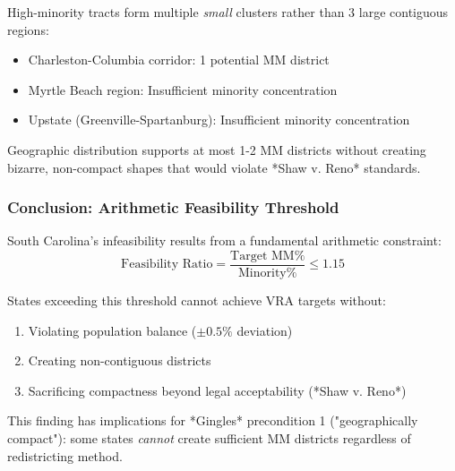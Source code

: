 High-minority tracts form multiple \textit{small} clusters rather than 3 large contiguous regions:
\begin{itemize}
    \item Charleston-Columbia corridor: 1 potential MM district
    \item Myrtle Beach region: Insufficient minority concentration
    \item Upstate (Greenville-Spartanburg): Insufficient minority concentration
\end{itemize}

Geographic distribution supports at most 1-2 MM districts without creating bizarre, non-compact shapes that would violate *Shaw v. Reno* standards.

\subsubsection{Conclusion: Arithmetic Feasibility Threshold}

South Carolina's infeasibility results from a fundamental arithmetic constraint:
\[
\text{Feasibility Ratio} = \frac{\text{Target MM\%}}{\text{Minority\%}} \leq 1.15
\]

States exceeding this threshold cannot achieve VRA targets without:
\begin{enumerate}
    \item Violating population balance ($\pm 0.5\%$ deviation)
    \item Creating non-contiguous districts
    \item Sacrificing compactness beyond legal acceptability (*Shaw v. Reno*)
\end{enumerate}

This finding has implications for *Gingles* precondition 1 ("geographically compact"): some states \textit{cannot} create sufficient MM districts regardless of redistricting method.
